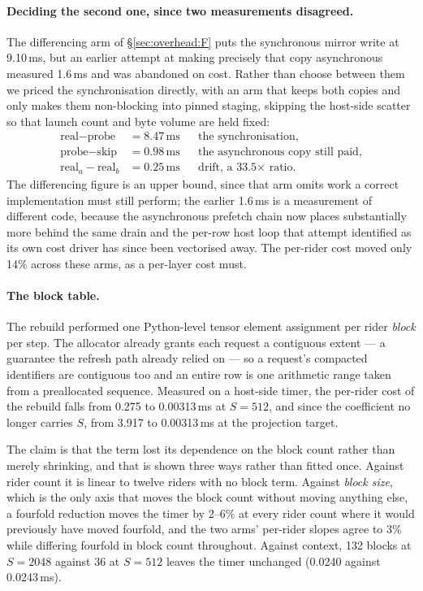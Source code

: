 \paragraph{Deciding the second one, since two measurements disagreed.} The
differencing arm of \S\ref{sec:overhead:F} puts the synchronous mirror write at
9.10\,ms, but an earlier attempt at making precisely that copy asynchronous
measured 1.6\,ms and was abandoned on cost. Rather than choose between them we
priced the synchronisation directly, with an arm that keeps both copies and only
makes them non-blocking into pinned staging, skipping the host-side scatter so
that launch count and byte volume are held fixed:
\begin{align*}
\textrm{real} - \textrm{probe} &= 8.47\,\textrm{ms} &&\textrm{the synchronisation},\\
\textrm{probe} - \textrm{skip} &= 0.98\,\textrm{ms} &&\textrm{the asynchronous copy still paid},\\
\textrm{real}_a - \textrm{real}_b &= 0.25\,\textrm{ms} &&\textrm{drift, a 33.5}\times\textrm{ ratio.}
\end{align*}
The differencing figure is an upper bound, since that arm omits work a correct
implementation must still perform; the earlier 1.6\,ms is a measurement of
different code, because the asynchronous prefetch chain now places substantially
more behind the same drain and the per-row host loop that attempt identified as
its own cost driver has since been vectorised away. The per-rider cost moved
only 14\% across these arms, as a per-layer cost must.

\paragraph{The block table.} The rebuild performed one Python-level tensor
element assignment per rider \emph{block} per step. The allocator already grants
each request a contiguous extent --- a guarantee the refresh path already relied
on --- so a request's compacted identifiers are contiguous too and an entire row
is one arithmetic range taken from a preallocated sequence. Measured on a
host-side timer, the per-rider cost of the rebuild falls from 0.275 to
0.00313\,ms at $S{=}512$, and since the coefficient no longer carries $S$, from
3.917 to 0.00313\,ms at the projection target.

The claim is that the term lost its dependence on the block count rather than
merely shrinking, and that is shown three ways rather than fitted once. Against
rider count it is linear to twelve riders with no block term. Against
\emph{block size}, which is the only axis that moves the block count without
moving anything else, a fourfold reduction moves the timer by 2--6\% at every
rider count where it would previously have moved fourfold, and the two arms'
per-rider slopes agree to 3\% while differing fourfold in block count
throughout. Against context, 132 blocks at $S{=}2048$ against 36 at $S{=}512$
leaves the timer unchanged (0.0240 against 0.0243\,ms).

